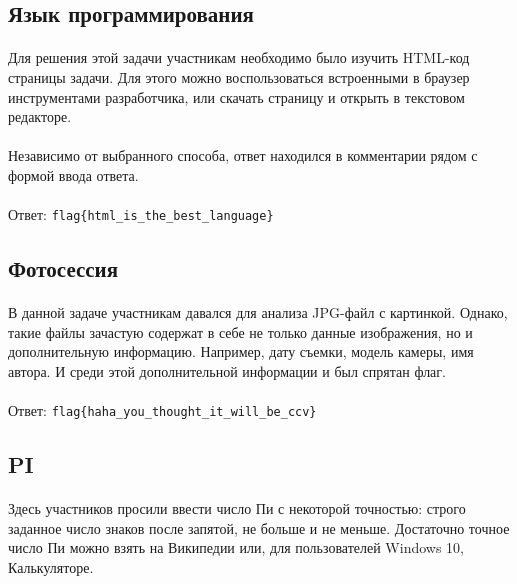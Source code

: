 \documentclass[12pt]{article}
\begin{document}

    \subsection{Язык программирования}
	\paragraph{}
    Для решения этой задачи участникам необходимо было изучить HTML-код страницы задачи.
	Для этого можно воспользоваться встроенными в браузер инструментами разработчика,
	или скачать страницу и открыть в текстовом редакторе.
	\paragraph{}
	Независимо от выбранного способа, ответ находился в комментарии рядом с формой ввода ответа.
    \paragraph{}
    Ответ: \verb|flag{html_is_the_best_language}|


    \subsection{Фотосессия}
	\paragraph{}
    В данной задаче участникам давался для анализа JPG-файл с картинкой.
	Однако, такие файлы зачастую содержат в себе не только данные изображения, но и дополнительную информацию.
	Например, дату съемки, модель камеры, имя автора.
	И среди этой дополнительной информации и был спрятан флаг.
    \paragraph{}
    Ответ: \verb|flag{haha_you_thought_it_will_be_ccv}|


    \subsection{PI}
	\paragraph{}
    Здесь участников просили ввести число Пи с некоторой точностью:
	строго заданное число знаков после запятой, не больше и не меньше.
	Достаточно точное число Пи можно взять на Википедии или, для пользователей Windows 10, Калькуляторе.
\end{document}
